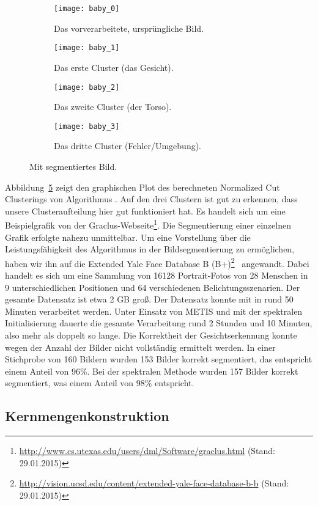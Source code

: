 \begin{figure}[t]
        \centering
        \begin{subfigure}[b]{0.5\textwidth}
        		\centering
                \texttt{[image: baby\_0]}
                \caption{Das vorverarbeitete, ursprüngliche Bild.}
                \label{fig:imageseg-kkmpp-k-3-a}
        \end{subfigure}%
        \begin{subfigure}[b]{0.5\textwidth}
        		\centering
                \texttt{[image: baby\_1]}
                \caption{Das erste Cluster (das Gesicht).}
                \label{fig:imageseg-kkmpp-k-3-b}
        \end{subfigure}
        \begin{subfigure}[b]{0.5\textwidth}
        		\centering
                \texttt{[image: baby\_2]}
                \caption{Das zweite Cluster (der Torso).}
                \label{fig:imageseg-kkmpp-k-3-c}
        \end{subfigure}%
        \begin{subfigure}[b]{0.5\textwidth}
        		\centering
                \texttt{[image: baby\_3]}
                \caption{Das dritte Cluster (Fehler/Umgebung).}
                \label{fig:imageseg-kkmpp-k-3-d}
        \end{subfigure}
\caption{Mit \kkmpp{} segmentiertes Bild.}
\label{fig:imageseg-kkmpp}
\end{figure}
Abbildung~\ref{fig:imageseg-kkmpp} zeigt den graphischen Plot des berechneten Normalized Cut Clusterings von
Algorithmus \kkmpp. Auf den drei Clustern ist gut zu erkennen, dass unsere Clusteraufteilung hier gut funktioniert hat. Es
handelt sich um eine Beispielgrafik von der
Graclus-Webseite\footnote{\url{http://www.cs.utexas.edu/users/dml/Software/graclus.html} (Stand: 29.01.2015)}.
\absatz
Die Segmentierung einer einzelnen Grafik erfolgte nahezu unmittelbar. Um eine Vorstellung über die Leistungsfähigkeit des
Algorithmus in der Bildsegmentierung zu ermöglichen, haben wir ihn auf die
Extended Yale Face Database B (B+)\footnote{\url{http://vision.ucsd.edu/content/extended-yale-face-database-b-b}
(Stand: 29.01.2015)}~\cite{GeorghiadesBK01} angewandt. Dabei handelt es sich um eine Sammlung von 16128 Portrait-Fotos von
28 Menschen in 9 unterschiedlichen Positionen und 64 verschiedenen Belichtungsszenarien. Der gesamte Datensatz ist etwa
2 GB groß. Der Datensatz konnte mit \kkmpp{} in rund 50 Minuten verarbeitet werden. Unter Einsatz von METIS und mit
der spektralen Initialisierung dauerte die gesamte Verarbeitung rund 2 Stunden und 10 Minuten, also mehr als doppelt so lange.
Die Korrektheit der Gesichtserkennung konnte wegen der Anzahl der Bilder nicht vollständig ermittelt werden. In einer
Stichprobe von 160 Bildern wurden 153 Bilder korrekt segmentiert, das entspricht einem Anteil von 96\%. Bei der spektralen
Methode wurden 157 Bilder korrekt segmentiert, was einem Anteil von 98\% entspricht.

\subsection{Kernmengenkonstruktion}
\label{subsection:experiment-coreset}